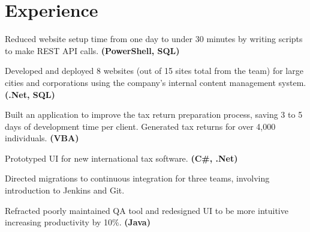 \documentclass[letterpaper]{kevin-resume} %
\begin{document}
\begin{minipage}[t]{0.63\textwidth} %


\section{Experience}

\vspace{\topsep} %
\begin{tightitemize}
	\item Reduced website setup time from one day to under 30 minutes by writing scripts to make REST API calls. \textbf{(PowerShell, SQL)}
	\item Developed and deployed 8 websites (out of 15 sites total from the team) for large cities and corporations using the company's internal content management system. \textbf{(.Net, SQL)}
\end{tightitemize}

\sectionspace %


\begin{tightitemize}
	\item Built an application to improve the tax return preparation process, saving 3 to 5 days of development time per client. Generated tax returns for over 4,000 individuals. \textbf{(VBA)}
	\item Prototyped UI for new international tax software. \textbf{(C\#, .Net)}
\end{tightitemize}

\sectionspace %


\begin{tightitemize}
	\item Directed migrations to continuous integration for three teams, involving introduction to Jenkins and Git.
	\item Refracted poorly maintained QA tool and redesigned UI to be more intuitive increasing productivity by 10\%. \textbf{(Java)}
\end{tightitemize}


\end{minipage}
\end{document}
